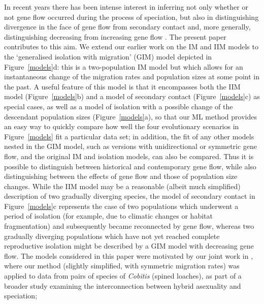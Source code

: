 \documentclass[11pt]{article}
\begin{document}
{\color{red} In recent years there has been intense interest 
in inferring not only whether or not gene flow occurred during the process of speciation, but also in distinguishing divergence in the face of gene flow from secondary contact and, more generally, distinguishing decreasing from increasing gene flow \citep[see, for example, the review by][]{Sousa2013, Roux2016}.
The present paper contributes to this aim.}  
We extend our earlier work on the IM and IIM models to the `generalised isolation with migration' (GIM) model depicted in Figure~\ref{models}d: this is a two-population IM model but which allows for an instantaneous change of the migration rates and population sizes at some point in the past. A useful feature of this model is that it encompasses both the IIM model (Figure~\ref{models}b) and a model of secondary contact (Figure~\ref{models}c) as special cases, as well as a model of isolation with a possible change of the descendant population sizes (Figure~\ref{models}a), so that our ML method provides an easy way to quickly compare how well the four evolutionary scenarios in Figure~\ref{models} fit a particular data set; in addition, the fit of any other models nested in the GIM model, such as versions with unidirectional or symmetric gene flow, and the original IM and isolation models, can also be compared. Thus it is possible to distinguish between historical and contemporary gene flow, while also distinguishing between the effects of gene flow and those of population size changes.
While the IIM model may be a reasonable 
(albeit much simplified)
description of two gradually diverging species, the model of secondary contact in Figure~\ref{models}c 
represents the case of two populations which underwent a period of isolation (for example, due to climatic changes or habitat fragmentation) and subsequently became reconnected by gene flow, whereas two gradually diverging populations which have not yet reached complete reproductive isolation might be described by a GIM model with decreasing gene flow.
The models considered in this paper were motivated by our joint work in 
\citet{Janko2018}, where our method (slightly simplified, with symmetric migration rates) was applied to data from pairs of species of {\em Cobitis} (spined loaches), {\color{red} as part of a broader study examining the interconnection between hybrid asexuality and speciation}; 
\end{document}
